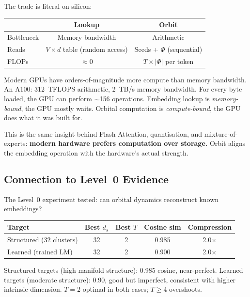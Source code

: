 \documentclass[11pt, a4paper]{article}
\theoremstyle{remark}
\begin{document}
The trade is literal on silicon:
\begin{center}\small
\renewcommand{\arraystretch}{1.3}
\begin{tabular}{@{}lcc@{}}
\toprule
& \textbf{Lookup} & \textbf{Orbit} \\
\midrule
Bottleneck & Memory bandwidth & Arithmetic \\
Reads & $V \times d$ table (random access) & Seeds + $\Phi$ (sequential) \\
FLOPs & $\approx 0$ & $T \times |\Phi|$ per token \\
\bottomrule
\end{tabular}
\end{center}

Modern GPUs have orders-of-magnitude more compute than memory bandwidth.
An A100: 312~TFLOPS arithmetic, 2~TB/s memory bandwidth.
For every byte loaded, the GPU can perform $\sim$156 operations.
Embedding lookup is \emph{memory-bound}, the GPU mostly waits.
Orbital computation is \emph{compute-bound}, the GPU does what it was built for.

This is the same insight behind Flash Attention, quantisation, and mixture-of-experts:
\textbf{modern hardware prefers computation over storage.}
Orbit aligns the embedding operation with the hardware's actual strength.

\subsection{Connection to Level~0 Evidence}

The Level~0 experiment tested: can orbital dynamics reconstruct known embeddings?

\begin{center}\small
\renewcommand{\arraystretch}{1.2}
\begin{tabular}{lcccc}
\toprule
\textbf{Target} & \textbf{Best $d_s$} & \textbf{Best $T$} & \textbf{Cosine sim} & \textbf{Compression} \\
\midrule
Structured (32 clusters) & 32 & 2 & 0.985 & 2.0$\times$ \\
Learned (trained LM) & 32 & 2 & 0.900 & 2.0$\times$ \\
\bottomrule
\end{tabular}
\end{center}

\noindent
Structured targets (high manifold structure): 0.985 cosine, near-perfect.
Learned targets (moderate structure): 0.90, good but imperfect, consistent with higher intrinsic dimension.
$T{=}2$ optimal in both cases; $T{\geq}4$ overshoots.
\end{document}
